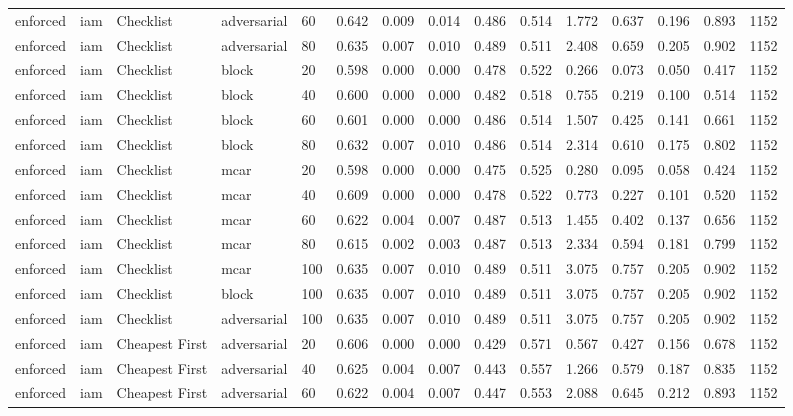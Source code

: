 \begin{table}[!ht]
{\begin{tabular}{lllllllllllllll}
enforced & iam & Checklist & adversarial & 60 & 0.642 & 0.009 & 0.014 & 0.486 & 0.514 & 1.772 & 0.637 & 0.196 & 0.893 & 1152 \\
enforced & iam & Checklist & adversarial & 80 & 0.635 & 0.007 & 0.010 & 0.489 & 0.511 & 2.408 & 0.659 & 0.205 & 0.902 & 1152 \\
enforced & iam & Checklist & block & 20 & 0.598 & 0.000 & 0.000 & 0.478 & 0.522 & 0.266 & 0.073 & 0.050 & 0.417 & 1152 \\
enforced & iam & Checklist & block & 40 & 0.600 & 0.000 & 0.000 & 0.482 & 0.518 & 0.755 & 0.219 & 0.100 & 0.514 & 1152 \\
enforced & iam & Checklist & block & 60 & 0.601 & 0.000 & 0.000 & 0.486 & 0.514 & 1.507 & 0.425 & 0.141 & 0.661 & 1152 \\
enforced & iam & Checklist & block & 80 & 0.632 & 0.007 & 0.010 & 0.486 & 0.514 & 2.314 & 0.610 & 0.175 & 0.802 & 1152 \\
enforced & iam & Checklist & mcar & 20 & 0.598 & 0.000 & 0.000 & 0.475 & 0.525 & 0.280 & 0.095 & 0.058 & 0.424 & 1152 \\
enforced & iam & Checklist & mcar & 40 & 0.609 & 0.000 & 0.000 & 0.478 & 0.522 & 0.773 & 0.227 & 0.101 & 0.520 & 1152 \\
enforced & iam & Checklist & mcar & 60 & 0.622 & 0.004 & 0.007 & 0.487 & 0.513 & 1.455 & 0.402 & 0.137 & 0.656 & 1152 \\
enforced & iam & Checklist & mcar & 80 & 0.615 & 0.002 & 0.003 & 0.487 & 0.513 & 2.334 & 0.594 & 0.181 & 0.799 & 1152 \\
enforced & iam & Checklist & mcar & 100 & 0.635 & 0.007 & 0.010 & 0.489 & 0.511 & 3.075 & 0.757 & 0.205 & 0.902 & 1152 \\
enforced & iam & Checklist & block & 100 & 0.635 & 0.007 & 0.010 & 0.489 & 0.511 & 3.075 & 0.757 & 0.205 & 0.902 & 1152 \\
enforced & iam & Checklist & adversarial & 100 & 0.635 & 0.007 & 0.010 & 0.489 & 0.511 & 3.075 & 0.757 & 0.205 & 0.902 & 1152 \\
enforced & iam & Cheapest First & adversarial & 20 & 0.606 & 0.000 & 0.000 & 0.429 & 0.571 & 0.567 & 0.427 & 0.156 & 0.678 & 1152 \\
enforced & iam & Cheapest First & adversarial & 40 & 0.625 & 0.004 & 0.007 & 0.443 & 0.557 & 1.266 & 0.579 & 0.187 & 0.835 & 1152 \\
enforced & iam & Cheapest First & adversarial & 60 & 0.622 & 0.004 & 0.007 & 0.447 & 0.553 & 2.088 & 0.645 & 0.212 & 0.893 & 1152 \\

\end{tabular}}
\end{table}
